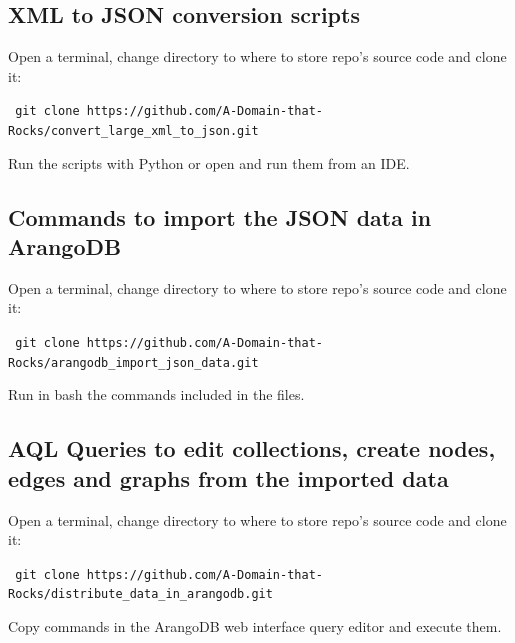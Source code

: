 \subsection{XML to JSON conversion scripts} \label{subsection:SourceCode/Instructionshowtorunbuildanddeploy/XMLtoJSONconversionscripts}
\noindent Open a terminal, change directory to where to store repo's source code and clone it:

\noindent\colorbox{lightestgray}{
	\parbox{1\linewidth-9pt}{%
		\texttt{\tiny\faDollarSign\large\ git clone https://github.com/A-Domain-that-Rocks/convert\_large\_xml\_to\_json.git}
	}%
}%

\medskip

\noindent Run the scripts with \gls{Python} or open and run them from an IDE.

\subsection{Commands to import the JSON data in ArangoDB} \label{subsection:SourceCode/Instructionshowtorunbuildanddeploy/CommandstoimporttheJSONdatainArangoDB}
\noindent Open a terminal, change directory to where to store repo's source code and clone it:

\noindent\colorbox{lightestgray}{
	\parbox{1\linewidth-9pt}{%
		\texttt{\tiny\faDollarSign\large\ git clone https://github.com/A-Domain-that-Rocks/arangodb\_import\_json\_data.git}
	}%
}%

\medskip

\noindent Run in bash the commands included in the files.

\subsection[AQL Queries to edit collections, create nodes, edges and graphs from the imported data]{\acrshort{AQL} Queries to edit collections, create nodes, edges and graphs from the imported data} \label{subsection:SourceCode/Instructionshowtorunbuildanddeploy/AQLQueriestoeditcollectionscreatenodesedgesandgraphsfromtheimporteddata}
\noindent Open a terminal, change directory to where to store repo's source code and clone it:

\noindent\colorbox{lightestgray}{
	\parbox{1\linewidth-9pt}{%
		\texttt{\tiny\faDollarSign\large\ git clone https://github.com/A-Domain-that-Rocks/distribute\_data\_in\_arangodb.git}
	}%
}%

\medskip

\noindent Copy commands in the ArangoDB web interface query editor and execute them.


